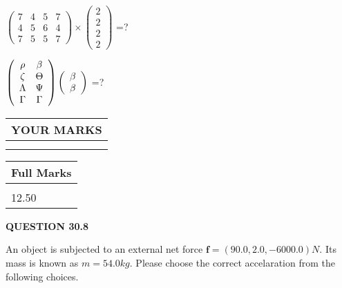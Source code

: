 \documentclass[12pt]{article}
\begin{document}
  
 
$ \left( \begin{array}{ccccccccc}
           7 & 
           4 & 
           5 & 
           7 \\ 
           4 & 
           5 & 
           6 & 
           4 \\ 
           7 & 
           5 & 
           5 & 
           7
\end{array}\right) \times
\left( \begin{array}{c}
           2 \\ 
           2 \\ 
           2 \\ 
           2
\end{array}\right) $ =?
 
 
$  %
 \left( \begin{array}
 {
 c
 c
 }
 \rho & 
 \beta \\ 
                    \zeta & 
 \Theta \\ 
 \Lambda & 
 \Psi \\ 
 \Gamma & 
 \Gamma
 \end{array} \right)
 \left( \begin{array}
 {
 c
 }
 \beta \\ 
 \beta
 \end{array} \right)
$ =?
 

 

 
\vspace{0.3in}
  
\vspace{0.2in}
  
\noindent\begin{tabular}{|l|}
\hline
 YOUR MARKS  \\
\hline
 \\ 
 \\ 
\hline
\end{tabular}
\hspace{0.05in} \begin{tabular}{|l|}
\hline
 Full Marks  \\
\hline
 \\ 
12.50 \\
\hline
\end{tabular}
{\textbf{\Large{QUESTION
30.8 
}}}
  
  
 
An object is subjected to an external net force $\mathbf{f}=
(90.0 , 2.0 , -6000.0) N$.
Its mass is known as $m= %
54.0 kg$.
Please choose the correct accelaration from the following choices.
  
\end{document}
